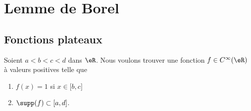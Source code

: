 \section{Lemme de Borel}

\subsection{Fonctions plateaux}

Soient \( a<b<c<d\) dans \( \eR\). Nous voulons trouver une fonction \( f\in C^{\infty}(\eR)\) à valeurs positives telle que
\begin{enumerate}
    \item
        \( f(x)=1\) si \( x\in\mathopen[ b , c \mathclose]\)
    \item
        \( \supp(f)\subset\mathopen[ a , d \mathclose]\).
\end{enumerate}


